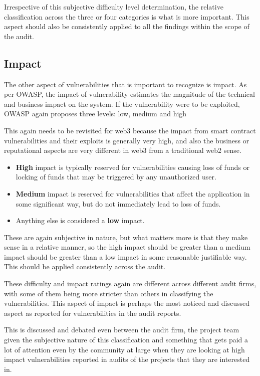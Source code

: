 Irrespective of this subjective difficulty level determination, the
relative classification across the three or four categories is what is
more important. This aspect should also be consistently applied to all
the findings within the scope of the audit.

\subsection{Impact}\label{impact}

The other aspect of vulnerabilities that is important to recognize is
impact. As per OWASP, the impact of vulnerability estimates the
magnitude of the technical and business impact on the system. If the
vulnerability were to be exploited, OWASP again proposes three levels:
low, medium and high

This again needs to be revisited for web3 because the impact from smart
contract vulnerabilities and their exploits is generally very high, and
also the business or reputational aspects are very different in web3
from a traditional web2 sense.

\begin{itemize}
\tightlist
\item
  \textbf{High} impact is typically reserved for vulnerabilities causing
  loss of funds or locking of funds that may be triggered by any
  unauthorized user.
\item
  \textbf{Medium} impact is reserved for vulnerabilities that affect the
  application in some significant way, but do not immediately lead to
  loss of funds.
\item
  Anything else is considered a \textbf{low} impact.
\end{itemize}

These are again subjective in nature, but what matters more is that they
make sense in a relative manner, so the high impact should be greater
than a medium impact should be greater than a low impact in some
reasonable justifiable way. This should be applied consistently across
the audit.

These difficulty and impact ratings again are different across different
audit firms, with some of them being more stricter than others in
classifying the vulnerabilities. This aspect of impact is perhaps the
most noticed and discussed aspect as reported for vulnerabilities in the
audit reports.

This is discussed and debated even between the audit firm, the project
team given the subjective nature of this classification and something
that gets paid a lot of attention even by the community at large when
they are looking at high impact vulnerabilities reported in audits of
the projects that they are interested in.

